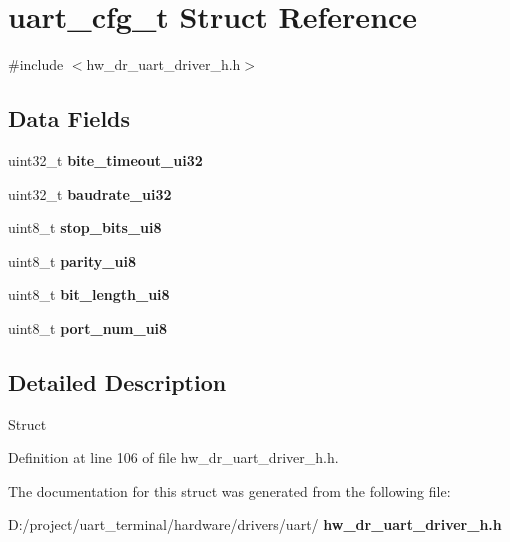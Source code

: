 \section{uart\+\_\+cfg\+\_\+t Struct Reference}
\label{structuart__cfg__t}


{\ttfamily \#include $<$hw\+\_\+dr\+\_\+uart\+\_\+driver\+\_\+h.\+h$>$}

\subsection*{Data Fields}
\begin{DoxyCompactItemize}
\item 
\mbox{\label{structuart__cfg__t_a21b4fafd71a101090e9f60612c765009}} 
uint32\+\_\+t {\bfseries bite\+\_\+timeout\+\_\+ui32}
\item 
\mbox{\label{structuart__cfg__t_aaf32d07fc189441af4e2649a7339d9e9}} 
uint32\+\_\+t {\bfseries baudrate\+\_\+ui32}
\item 
\mbox{\label{structuart__cfg__t_a84083bd69901d4426b683bc9398e44aa}} 
uint8\+\_\+t {\bfseries stop\+\_\+bits\+\_\+ui8}
\item 
\mbox{\label{structuart__cfg__t_a6c40dc6f6a6dfaf793c4552a447b9cb3}} 
uint8\+\_\+t {\bfseries parity\+\_\+ui8}
\item 
\mbox{\label{structuart__cfg__t_a17a301f9f53b00cbe8d34ef64c4ec1e2}} 
uint8\+\_\+t {\bfseries bit\+\_\+length\+\_\+ui8}
\item 
\mbox{\label{structuart__cfg__t_ab8327f881c62d8fd08bc3ee7ab400c1e}} 
uint8\+\_\+t {\bfseries port\+\_\+num\+\_\+ui8}
\end{DoxyCompactItemize}


\subsection{Detailed Description}
Struct 

Definition at line 106 of file hw\+\_\+dr\+\_\+uart\+\_\+driver\+\_\+h.\+h.



The documentation for this struct was generated from the following file\+:\begin{DoxyCompactItemize}
\item 
D\+:/project/uart\+\_\+terminal/hardware/drivers/uart/\textbf{ hw\+\_\+dr\+\_\+uart\+\_\+driver\+\_\+h.\+h}\end{DoxyCompactItemize}
